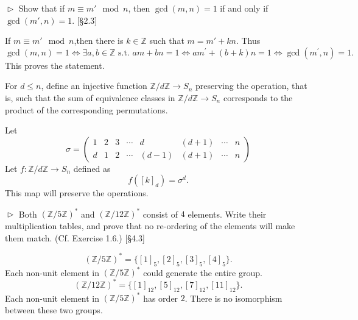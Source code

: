 \begin{problem}[2.17]
$\vartriangleright$ Show that if $m\equiv m'\mod n$, then $\gcd(m,n) = 1$ if and only if $\gcd(m',n)=1$. [\S 2.3]
\end{problem}
\begin{solution}
If $m \equiv m'\mod n$,then there is $k\in\mathbb{Z}$ such that $m=m'+kn$.
Thus
$$\gcd(m, n) = 1 \iff \exists a, b\in\mathbb{Z}\text{ s.t. } am+bn=1\iff am^{\prime}+(b+k)n =1\iff \gcd(m^{\prime},n)=1.$$
This proves the statement.
\end{solution}

\begin{problem}[2.18]
For $d \leq n$, define an injective function $\mathbb{Z}/d\mathbb{Z} \to S_n$ preserving the operation,
that is, such that the sum of equivalence classes in $\mathbb{Z}/d\mathbb{Z} \to S_n$ corresponds to the product
of the corresponding permutations.
\end{problem}
\begin{solution}
Let \[\sigma=\left(
        \begin{matrix}  
        1 & 2 & 3 & \cdots & d & (d+1) &\cdots & n\\     
    	d & 1 & 2 & \cdots & (d-1) &(d+1) &\cdots & n  
        \end{matrix}
        \right)
 \]
Let $f: \mathbb{Z}/d\mathbb{Z} \to S_n$ defined as 
$$f([k]_d) = \sigma^d.$$
This map will preserve the operations.
\end{solution}


\begin{problem}[2.19]
$\vartriangleright$ Both $(\mathbb{Z}/5\mathbb{Z})^{\ast}$ and $(\mathbb{Z}/12\mathbb{Z})^{\ast}$ consist of $4$ elements.
Write their multiplication tables, and prove that no re-ordering of the elements will make them match.
(Cf. Exercise 1.6.) [\S 4.3]
\end{problem}
\begin{solution}
$$(\mathbb{Z}/5\mathbb{Z})^{\ast} = \{[1]_5,[2]_5,[3]_5, [4]_5\}.$$ Each non-unit element in $(\mathbb{Z}/5\mathbb{Z})^{\ast}$ could generate the entire group.
$$(\mathbb{Z}/12\mathbb{Z})^{\ast} =\{[1]_{12}, [5]_{12}, [7]_{12}, [11]_{12}\}.$$ Each non-unit element in $(\mathbb{Z}/5\mathbb{Z})^{\ast}$ has order $2$. 
There is no isomorphism between these two groups.
\end{solution}
